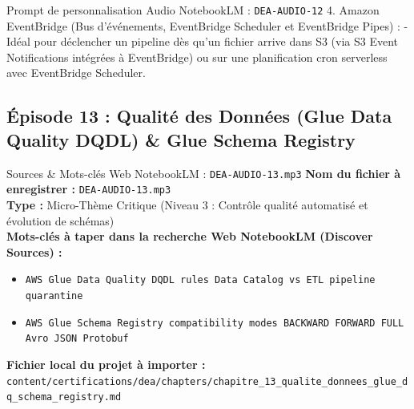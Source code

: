 \documentclass[11pt,a4paper]{article}
\begin{document}
\begin{promptbox}{Prompt de personnalisation Audio NotebookLM : \texttt{DEA-AUDIO-12}}
4. Amazon EventBridge (Bus d'événements, EventBridge Scheduler et EventBridge Pipes) :
- Idéal pour déclencher un pipeline dès qu'un fichier arrive dans S3 (via S3 Event Notifications intégrées à EventBridge) ou sur une planification cron serverless avec EventBridge Scheduler.
\end{promptbox}

\subsection{Épisode 13 : Qualité des Données (Glue Data Quality DQDL) \& Glue Schema Registry}
\begin{sourcebox}{Sources \& Mots-clés Web NotebookLM : \texttt{DEA-AUDIO-13.mp3}}
\textbf{Nom du fichier à enregistrer :} \texttt{DEA-AUDIO-13.mp3}\\
\textbf{Type :} Micro-Thème Critique (Niveau 3 : Contrôle qualité automatisé et évolution de schémas)\\
\textbf{Mots-clés à taper dans la recherche Web NotebookLM (Discover Sources) :}
\begin{itemize}[noitemsep]
    \item \texttt{AWS Glue Data Quality DQDL rules Data Catalog vs ETL pipeline quarantine}
    \item \texttt{AWS Glue Schema Registry compatibility modes BACKWARD FORWARD FULL Avro JSON Protobuf}
\end{itemize}
\textbf{Fichier local du projet à importer :}
\texttt{content/certifications/dea/chapters/chapitre_13_qualite_donnees_glue_dq_schema_registry.md}
\end{sourcebox}
\end{document}
